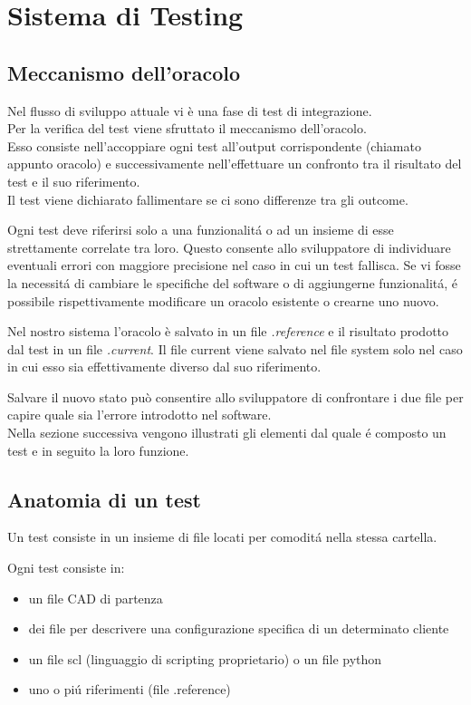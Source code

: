 \chapter{Sistema di Testing}
    \section{Meccanismo dell'oracolo\label{oracolo}}
        Nel flusso di sviluppo attuale vi è una fase di test di integrazione.\\
        Per la verifica del test viene sfruttato il meccanismo dell’oracolo.\\
        Esso consiste nell'accoppiare ogni test all'output corrispondente (chiamato appunto oracolo)
        e successivamente nell'effettuare un confronto tra il risultato del test e il suo riferimento.\\
        Il test viene dichiarato fallimentare se ci sono differenze tra gli outcome.
        
        Ogni test deve riferirsi solo a una funzionalit\'a o ad un insieme di esse strettamente correlate tra loro.
        Questo consente allo sviluppatore di individuare eventuali errori con maggiore precisione nel caso in cui un test fallisca. 
        Se vi fosse la necessit\'a di cambiare le specifiche del software o di aggiungerne funzionalit\'a, \'e possibile rispettivamente modificare un oracolo esistente o crearne uno nuovo. 

        Nel nostro sistema l'oracolo è salvato in un file \textit{.reference} e il risultato prodotto
        dal test in un file \textit{.current}.
        Il file current viene salvato nel file system solo nel caso in cui esso sia effettivamente diverso dal suo riferimento.
        
        Salvare il nuovo stato può consentire allo sviluppatore di confrontare i due file per capire quale sia l'errore introdotto nel software. \\
        Nella sezione successiva vengono illustrati gli elementi dal quale \'e composto un test e in seguito la loro funzione.
    \section{Anatomia di un test\label{testanatomy}}
        Un test consiste in un insieme di file locati per comodit\'a nella stessa cartella. 

        Ogni test consiste in:
        \begin{itemize}
            \item un file CAD di partenza
            \item dei file per descrivere una configurazione specifica di un determinato cliente
            \item un file scl (linguaggio di scripting proprietario) o un file python
            \item uno o pi\'u riferimenti (file .reference)
        \end{itemize}

